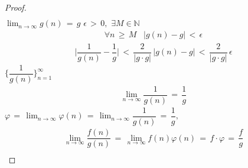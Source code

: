 \begin{theorem}
\begin{proof}
\begin{align*}
    \end{align*}
     $\lim_{n \longrightarrow \infty} g(n) \hspace{2pt} = \hspace{2pt} g$  $\epsilon \hspace{2pt} > \hspace{2pt} 0,$  $\exists M \in \mathbb{N}$ 
    \begin{align*}
        \forall n \hspace{2pt} \geq \hspace{2pt} M \hspace{10pt} \lvert g(n) - g \rvert \hspace{2pt} < \hspace{2pt} \epsilon
    \end{align*}
    \begin{align*}
        \Big\lvert \dfrac{1}{g(n)} - \dfrac{1}{g} \Big\rvert \hspace{2pt} < \hspace{2pt} \dfrac{2}{\lvert g \cdot g \rvert} \hspace{2pt} \lvert g(n) - g \rvert \hspace{2pt} < \hspace{2pt} \dfrac{2}{\lvert g \cdot g \rvert} \hspace{2pt} \epsilon
    \end{align*}
     $\Big\{\dfrac{1}{g(n)}\Big\}_{n = 1}^{\infty}$
    \begin{align*}
        \lim_{n \longrightarrow \infty} \dfrac{1}{g(n)} \hspace{2pt} = \hspace{2pt} \dfrac{1}{g}
    \end{align*}
     $\varphi \hspace{2pt} = \hspace{2pt} \lim_{n \longrightarrow \infty} \varphi (n) \hspace{2pt} = \hspace{2pt} \lim_{n \longrightarrow \infty} \dfrac{1}{g(n)} \hspace{2pt} = \hspace{2pt} \dfrac{1}{g},$ 
    \begin{align*}
        \lim_{n \longrightarrow \infty} \dfrac{f(n)}{g(n)} \hspace{2pt} = \hspace{2pt} \lim_{n \longrightarrow \infty} f(n) \varphi (n) \hspace{2pt} = \hspace{2pt} f \cdot \varphi \hspace{2pt} = \hspace{2pt} \dfrac{f}{g} \\[4ex] 

\end{align*}
\end{proof}
\end{theorem}
